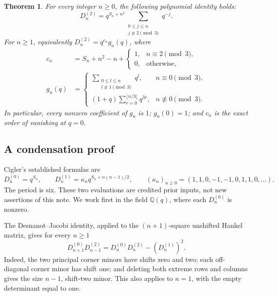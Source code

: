 \documentclass[11pt]{article}
\newtheorem{theorem}{Theorem}
\begin{document}
\begin{theorem}\label{evaluation}
For every integer \(n\ge0\), the following polynomial identity holds:
\begin{equation}\label{sum}
 D_n^{(2)}
   =q^{S_n+n^2}
      \sum_{\substack{0\le j\le n\\j\not\equiv2\pmod3}}q^{-j}.
\end{equation}
For \(n\ge1\), equivalently \(D_n^{(2)}=q^{c_n}g_n(q)\), where
\begin{align}
 c_n&=S_n+n^2-n+
             \begin{cases}1,&n\equiv2\pmod3,\\0,&\text{otherwise},\end{cases}
                                                        \label{exponent}\\
 g_n(q)&=
 \begin{cases}
 \displaystyle\sum_{\substack{0\le l\le n\\l\not\equiv1\pmod3}}q^l,
                    &n\equiv0\pmod3,\\[5pt]
 \displaystyle(1+q)\sum_{r=0}^{\lfloor n/3\rfloor}q^{3r},
                    &n\not\equiv0\pmod3.
 \end{cases}                                            \label{normalized}
\end{align}
In particular, every nonzero coefficient of \(g_n\) is \(1\);
\(g_n(0)=1\); and \(c_n\) is the exact order of vanishing at \(q=0\).
\end{theorem}

\subsection*{A condensation proof}
Cigler's established formulas \cite[Eqs.~(39)--(40)]{Cigler} are
\begin{equation}\label{known}
 D_n^{(0)}=q^{S_n},\qquad
 D_n^{(1)}=\kappa_n q^{S_n+n(n-1)/2},
 \qquad
 (\kappa_n)_{n\ge0}=(1,1,0,-1,-1,0,1,1,0,\ldots).
\end{equation}
The period is six. These two evaluations are credited prior inputs,
not new assertions of this note. We work first in the field
\(\mathbb Q(q)\), where each \(D_n^{(0)}\) is nonzero.

The Desnanot--Jacobi identity, applied to the \((n+1)\)-square
unshifted Hankel matrix, gives for every \(n\ge1\)
\begin{equation}\label{condense}
 D_{n+1}^{(0)}D_{n-1}^{(2)}
      =D_n^{(0)}D_n^{(2)}-(D_n^{(1)})^2 .
\end{equation}
Indeed, the two principal corner minors have shifts zero and two;
each off-diagonal corner minor has shift one; and deleting both
extreme rows and columns gives the size \(n-1\), shift-two minor.
This also applies to \(n=1\), with the empty determinant equal to one.
\end{document}
